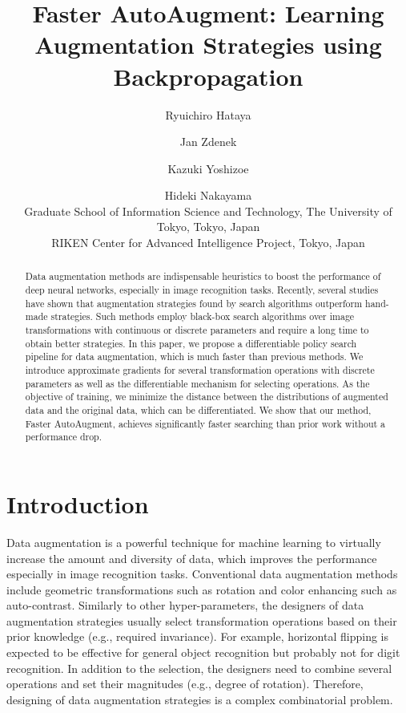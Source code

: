 \documentclass[10pt,twocolumn,letterpaper]{article}
\newcommand{\autoaugment}{AutoAugment\xspace}
\newcommand{\faster}{Faster \autoaugment}
\begin{document}
\title{\faster: Learning Augmentation Strategies using Backpropagation}

\author{Ryuichiro Hataya \and Jan Zdenek \and Kazuki Yoshizoe \and Hideki Nakayama \\
 Graduate School of Information Science and Technology, The University of Tokyo, Tokyo, Japan\\
 RIKEN Center for Advanced Intelligence Project, Tokyo, Japan\\
}

\maketitle


\begin{abstract}

Data augmentation methods are indispensable heuristics to boost the performance of deep neural networks, especially in image recognition tasks. Recently, several studies have shown that augmentation strategies found by search algorithms outperform hand-made strategies. Such methods employ black-box search algorithms over image transformations with continuous or discrete parameters and require a long time to obtain better strategies. In this paper,  we propose a differentiable policy search pipeline for data augmentation, which is much faster than previous methods. We introduce approximate gradients for several transformation operations with discrete parameters as well as the differentiable mechanism for selecting operations. As the objective of training, we minimize the distance between the distributions of augmented data and the original data, which can be differentiated. We show that our method, \faster, achieves significantly faster searching than prior work without a performance drop.

\end{abstract}

\section{Introduction}\label{sec:intorduction}

Data augmentation is a powerful technique for machine learning to virtually increase the amount and diversity of data, which improves the performance especially in image recognition tasks. Conventional data augmentation methods include geometric transformations such as rotation and color enhancing such as auto-contrast. 
Similarly to other hyper-parameters, the designers of data augmentation strategies usually select transformation operations based on their prior knowledge (e.g., required invariance). For example, horizontal flipping is expected to be effective for general object recognition but probably not for digit recognition. In addition to the selection, the designers need to combine several operations and set their magnitudes (e.g., degree of rotation). Therefore, designing of data augmentation strategies is a complex combinatorial problem.
\end{document}
